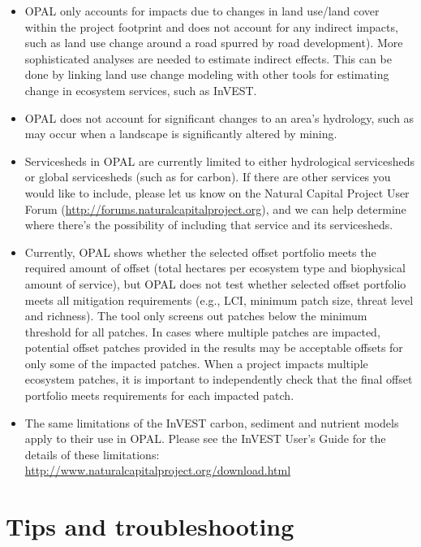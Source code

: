 \documentclass[11pt,letterpaper]{report}
\begin{document}
	\begin{itemize}
		\item OPAL only accounts for impacts due to changes in land use/land cover within the project footprint and does not account for any indirect impacts, such as  land use change around a road spurred by road development). More sophisticated analyses are needed to estimate indirect effects. This can be done by linking land use change modeling with other tools for estimating change in ecosystem services, such as InVEST.
		
		\item OPAL does not account for significant changes to an area's hydrology, such as may occur when a landscape is significantly altered by mining.
		
		\item Servicesheds in OPAL are currently limited to either hydrological servicesheds or global servicesheds (such as for carbon). If there are other services you would like to include, please let us know on the Natural Capital Project User Forum (\url{http://forums.naturalcapitalproject.org}), and we can help determine where there’s the possibility of including that service and its servicesheds.
	
		\item Currently, OPAL shows whether the selected offset portfolio meets the required amount of offset (total hectares per ecosystem type and biophysical amount of service), but OPAL does not test whether selected offset portfolio meets all mitigation requirements (e.g., LCI, minimum patch size, threat level and richness). The tool only screens out patches below the minimum threshold for all patches. In cases where multiple patches are impacted, potential offset patches provided in the results may be acceptable offsets for only some of the impacted patches. When a project impacts multiple ecosystem patches, it is important to independently check that the final offset portfolio meets requirements for each impacted patch.
		
		\item The same limitations of the InVEST carbon, sediment and nutrient models apply to their use in OPAL. Please see the InVEST User's Guide for the details of these limitations: \url{http://www.naturalcapitalproject.org/download.html}
	\end{itemize}

\chapter{Tips and troubleshooting}
	
\end{document}
